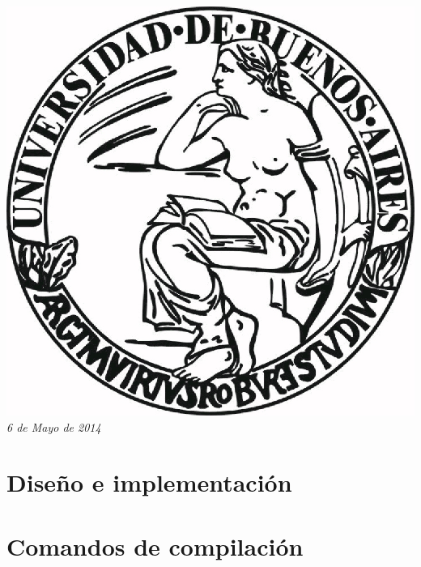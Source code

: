 \documentclass{article}
\begin{document}
\begin{titlepage}
\includegraphics[scale=0.5]{img/UBA.jpg}\\[1cm] %


{\large \text \em {6 de Mayo de 2014}}\\[3cm] %
 

\vfill %

\end{titlepage}

\tableofcontents

\newpage

\section{Diseño e implementación}


\section{Comandos de compilación}
\end{document}
